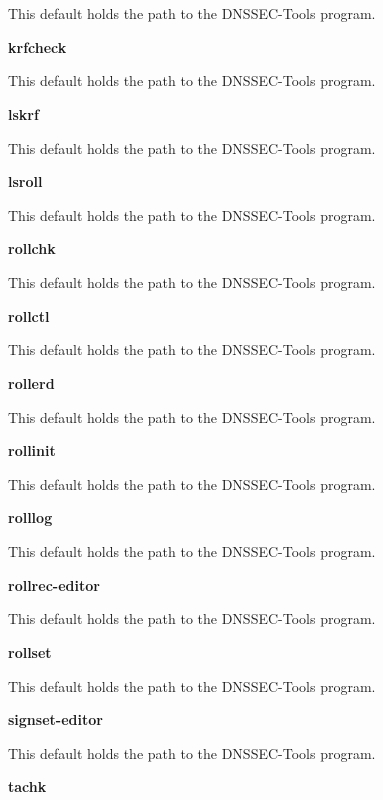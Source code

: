 \begin{description}
This default holds the path to the DNSSEC-Tools  program.

\item {\bf krfcheck}\verb" "

This default holds the path to the DNSSEC-Tools  program.

\item {\bf lskrf}\verb" "

This default holds the path to the DNSSEC-Tools  program.

\item {\bf lsroll}\verb" "

This default holds the path to the DNSSEC-Tools  program.

\item {\bf rollchk}\verb" "

This default holds the path to the DNSSEC-Tools  program.

\item {\bf rollctl}\verb" "

This default holds the path to the DNSSEC-Tools  program.

\item {\bf rollerd}\verb" "

This default holds the path to the DNSSEC-Tools  program.

\item {\bf rollinit}\verb" "

This default holds the path to the DNSSEC-Tools  program.

\item {\bf rolllog}\verb" "

This default holds the path to the DNSSEC-Tools  program.

\item {\bf rollrec-editor}\verb" "

This default holds the path to the DNSSEC-Tools  program.

\item {\bf rollset}\verb" "

This default holds the path to the DNSSEC-Tools  program.

\item {\bf signset-editor}\verb" "

This default holds the path to the DNSSEC-Tools  program.

\item {\bf tachk}\verb" "


\end{description}
